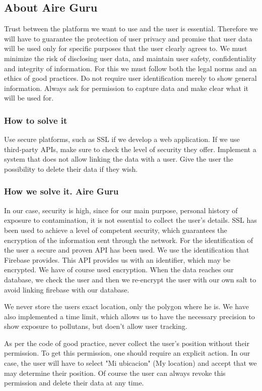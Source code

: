 \subsection{About Aire Guru}
Trust between the platform we want to use and the user is essential.
Therefore we will have to guarantee the protection of user privacy and promise that user data will be used only for specific purposes that the user clearly agrees to.
We must minimize the risk of disclosing user data, and maintain user safety, confidentiality and integrity of information.
For this we must follow both the legal norms and an ethics of good practices.
Do not require user identification merely to show general information.
Always ask for permission to capture data and make clear what it will be used for.

\subsubsection*{How to solve it} 
Use secure platforms, such as SSL if we develop a web application.
If we use third-party APIs, make sure to check the level of security they offer.
Implement a system that does not allow linking the data with a user.
Give the user the possibility to delete their data if they wish.


\subsubsection*{How we solve it. Aire Guru} 
In our case, security is high, since for our main purpose, personal history
of exposure to contamination, it is not essential to collect the user's details.
SSL has been used to achieve a level of competent security, which guarantees the encryption of
the information sent through the network.
For the identification of the user a secure and proven API has been used. We use the identification
that Firebase provides. This API provides us with an identifier, which may be encrypted.
We have of course used encryption. When the data reaches our database,
we check the user and then we re-encrypt the user with our own salt to
avoid linking firebase with our database.

We never store the users exact location, only the polygon where he is.
We have also implemented a time limit, which allows us to have the necessary precision to show exposure to pollutans, but doen't allow user tracking.

As per the code of good practice, never collect the user's position without their permission.
To get this permission, one should require an explicit action. In our case, the user will have to select "Mi ubicacion" (My location) and accept 
that we may determine their position. Of course the user can always revoke this permission and
delete their data at any time. \\

